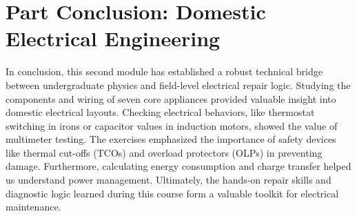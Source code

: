 \documentclass[11pt,a4paper]{report}
\begin{document}
\chapter*{Part Conclusion: Domestic Electrical Engineering}
In conclusion, this second module has established a robust technical bridge between undergraduate physics and field-level electrical repair logic. Studying the components and wiring of seven core appliances provided valuable insight into domestic electrical layouts. Checking electrical behaviors, like thermostat switching in irons or capacitor values in induction motors, showed the value of multimeter testing. The exercises emphasized the importance of safety devices like thermal cut-offs (TCOs) and overload protectors (OLPs) in preventing damage. Furthermore, calculating energy consumption and charge transfer helped us understand power management. Ultimately, the hands-on repair skills and diagnostic logic learned during this course form a valuable toolkit for electrical maintenance.
\end{document}
